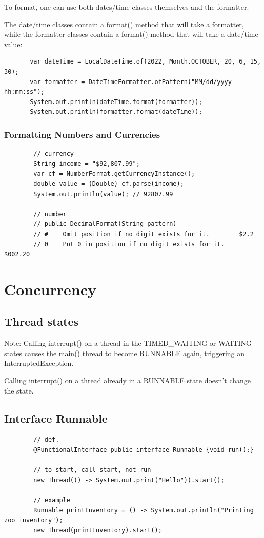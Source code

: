 \documentclass{scrartcl}
\begin{document}
    To format, one can use both dates/time classes themselves and the formatter.

    The date/time classes contain a format() method that will take a formatter, while the formatter classes contain a format() method that will take a date/time value:

    \begin{lstlisting}
       var dateTime = LocalDateTime.of(2022, Month.OCTOBER, 20, 6, 15, 30);
       var formatter = DateTimeFormatter.ofPattern("MM/dd/yyyy hh:mm:ss");
       System.out.println(dateTime.format(formatter));
       System.out.println(formatter.format(dateTime));
    \end{lstlisting}

\subsubsection{Formatting Numbers and Currencies}

    \begin{lstlisting}
        // currency
        String income = "$92,807.99";
        var cf = NumberFormat.getCurrencyInstance();
        double value = (Double) cf.parse(income);
        System.out.println(value); // 92807.99

        // number
        // public DecimalFormat(String pattern)
        // #	Omit position if no digit exists for it.		$2.2
        // 0	Put 0 in position if no digit exists for it.	$002.20
    \end{lstlisting}


\section{Concurrency}
\subsection{Thread states}

    Note: Calling interrupt()
    on a thread in the TIMED\_WAITING or WAITING states causes the main() thread to become RUNNABLE again, triggering an InterruptedException.

    Calling interrupt() on a thread already in a RUNNABLE state doesn’t change the state.

\subsection{Interface Runnable}
    \begin{lstlisting}
        // def.
        @FunctionalInterface public interface Runnable {void run();}

        // to start, call start, not run
        new Thread(() -> System.out.print("Hello")).start();

        // example
        Runnable printInventory = () -> System.out.println("Printing zoo inventory");
        new Thread(printInventory).start();
    \end{lstlisting}
\end{document}
